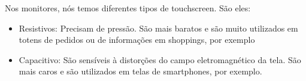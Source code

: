 \documentclass[12pt,a4paper]{report}
\begin{document}
	Nos monitores, nós temos diferentes tipos de touchscreen. São eles:
	
	\begin{itemize}
		\item Resistivos: Precisam de pressão. São mais baratos e são muito utilizados em totens de pedidos ou de informações em shoppings, por exemplo
		\item Capacitivo: São sensíveis à distorções do campo eletromagnético da tela. São mais caros e são utilizados em telas de smartphones, por exemplo.
	\end{itemize}
	
	
	
\end{document}
